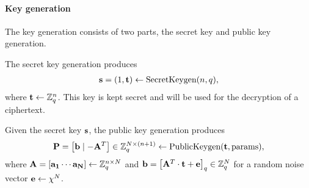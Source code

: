 \documentclass[../main.tex]{subfiles}
\begin{document}
\paragraph{Key generation} The key generation consists of two parts, the secret key and public key generation.

The secret key generation produces 
\begin{align*}
    \vc{s}=(1,\vc{t}) \leftarrow \seckeygen(n,q),%
\end{align*}
where $\mathbf{t} \leftarrow \mathbb{Z}_q^n$. This key is kept secret and will be used for the decryption of a ciphertext.


Given the secret key $\mathbf{s}$, the public key generation produces
\begin{align*}
    \mathbf{P}=\left[{\mathbf{b} \mid -\mathbf{A}^T}\right] \in \mathbb{Z}_q^{N \times (n+1)} \leftarrow \text{PublicKeygen}(\mathbf{t},\text{params}),
\end{align*}
where $\mathbf{A} = \left[{\mathbf{a_1} \cdots \mathbf{a_N}}\right] \leftarrow \mathbb{Z}_q^{n \times N}$ and ${\mathbf{b} = \left[{\mathbf{A}^T \cdot \mathbf{t} + \mathbf{e}}\right]_q \in \mathbb{Z}_q^N}$ for a random noise vector $\mathbf{e} \leftarrow \chi^N$.

\end{document}
